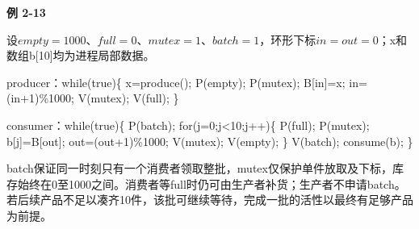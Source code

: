 {\color{ink}\bfseries 例 2-13}\par\vspace{1bp}设\(empty=\allowbreak{}1000\)、\(full=\allowbreak{}0\)、\(mutex=\allowbreak{}1\)、\(batch=\allowbreak{}1\)，环形下标\(in=\allowbreak{}out=\allowbreak{}0\)；x和数组b[10]均为进程局部数据。\par producer：while(true)\{ x=\allowbreak{}produce();\allowbreak{} P(empty);\allowbreak{} P(mutex);\allowbreak{} B[in]=\allowbreak{}x;\allowbreak{} in=\allowbreak{}(in+\allowbreak{}1)\%1000;\allowbreak{} V(mutex);\allowbreak{} V(full);\allowbreak{} \}\par consumer：while(true)\{ P(batch);\allowbreak{} for(j=\allowbreak{}0;\allowbreak{}j<10;\allowbreak{}j+\allowbreak{}+\allowbreak{})\{ P(full);\allowbreak{} P(mutex);\allowbreak{} b[j]=\allowbreak{}B[out];\allowbreak{} out=\allowbreak{}(out+\allowbreak{}1)\%1000;\allowbreak{} V(mutex);\allowbreak{} V(empty);\allowbreak{} \} V(batch);\allowbreak{} consume(b);\allowbreak{} \}\par batch保证同一时刻只有一个消费者领取整批，mutex仅保护单件放取及下标，库存始终在0至1000之间。消费者等full时仍可由生产者补货；生产者不申请batch。若后续产品不足以凑齐10件，该批可继续等待，完成一批的活性以最终有足够产品为前提。
